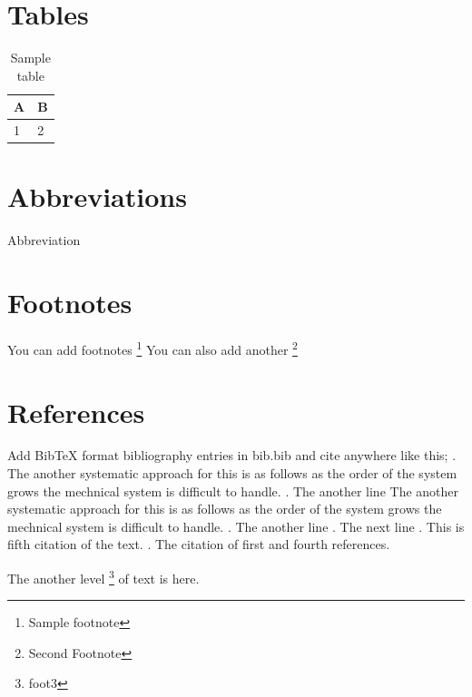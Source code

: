 \section{Tables}
\begin{table}
	\centering
	\begin{tabular}{l|l}
		A & B \\
		\hline 
		1 & 2 
	\end{tabular}
	\caption{Sample table}
	\label{tab:highlights}
\end{table}

\section{Abbreviations}
Abbreviation

\section{Footnotes}
You can add footnotes \footnote{Sample footnote}
You can also add another \footnote{Second Footnote}

\section{References}
Add BibTeX format bibliography entries in bib.bib and cite anywhere like this; \cite{cite1}. The another systematic approach for this is as follows as the order of the system grows the mechnical system is difficult to handle. \cite{cite2}. The another line The another systematic approach for this is as follows as the order of the system grows the mechnical system is difficult to handle. \cite{cite3} . The another line \cite{cite4}. The next line \cite{cite5}. This is fifth citation of the text. \cite{cite1,cite4}. The citation of first and fourth references.



The another level \footnote{foot3} of text is here.




